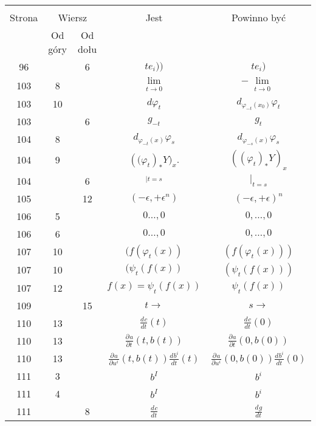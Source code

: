 \documentclass[a4paper,11pt]{article}
\newcommand{\Lim}{\lim\limits}
\newcommand{\pr}{\partial}
\newcommand{\ra}{\rightarrow}
\newcommand{\ld}{\ldots}
\newcommand{\eps}{\epsilon}
\newcommand{\vp}{\varphi}
\newcommand{\dd}[3]{\frac{ d^{ #1 } { #2 } }{ d { #3 }^{ #1 } }}
\newcommand{\pd}[3]{\frac{ \pr^{ #1 } { #2 } }{ \pr { #3 }^{ #1 } }}
\begin{document}
\begin{center}
  \begin{tabular}{|c|c|c|c|c|}
    \hline
    & \multicolumn{2}{c|}{} & & \\
    Strona & \multicolumn{2}{c|}{Wiersz} & Jest
                              & Powinno być \\ \cline{2-3}
    & Od góry & Od dołu &  &  \\
    \hline
    96 & &  6 & $t e_{ i } ))$ & $t e_{ i } )$ \\
    103 &  8 & & $\Lim_{ \substack{ t \ra 0 } }$
           & $-\Lim_{ \substack{ t \ra 0 } }$ \\
    103 & 10 & & $d \vp_{ t }$ & $d_{ \vp_{ -t }( x_{ 0 } ) } \vp_{ t }$ \\
    103 & & 6 & $g_{ -t }$ & $g_{ t }$ \\
    104 &  8 & & $d_{ \vp_{ -t }( x ) } \vp_{ s }$
           & $d_{ \vp_{ -s }( x ) } \vp_{ s }$ \\
    104 &  9 & & $( \big( \vp_{ t } )_{*} Y \big)_{ x }$.
           & $( ( \vp_{ t } )_{ * } Y )_{ x }$ \\
    104 & &  6 & $_{ | t = s }$ & $|_{ t = s }$ \\
    105 & & 12 & $( - \eps, + \eps^{ n } )$ & $( -\eps, +\eps )^{ n }$ \\
    106 &  5 & & $0\ld, 0$ & $0, \ld, 0$ \\
    106 &  6 & & $0\ld, 0$ & $0, \ld, 0$ \\
    107 & 10 & & $( f( \vp_{ t }( x ) )$ & $( f( \vp_{ t }( x ) ) )$ \\
    107 & 10 & & $( \psi_{ t } ( f( x ) )$ & $( \psi_{ t } ( f( x ) ) )$ \\
    107 & 12 & & $f( x ) = \psi_{ t } ( f( x ) )$
           & $\psi_{ t } ( f( x ) )$ \\
    109 & & 15 & $t \ra$ & $s \ra$ \\
    110 & 13 & & $\dd{}{ c }{ t }( t )$ & $\dd{}{ c }{ t }( 0 )$ \\
    110 & 13 & & $\pd{}{ a }{ t }( t, b( t ) )$
           & $\pd{}{ a }{ t }( 0, b( 0 ) )$ \\
    110 & 13 & & $\pd{}{ a }{ { u^{ i } } }( t, b( t ) )
                 \dd{}{ { b^{ i } } }{ t }( t )$
           & $\pd{}{ a }{ { u^{ i } } }( 0, b( 0 ) )
             \dd{}{ { b^{ i } } }{ t }( 0 )$ \\
    111 &  3 & & $b^{ I }$ & $b^{ i }$ \\
    111 &  4 & & $b^{ I }$ & $b^{ i }$ \\
    111 & &  8 & $\dd{}{ c }{ t }$ & $\dd{}{ g }{ t }$ \\

\end{tabular}
\end{center}
\end{document}
